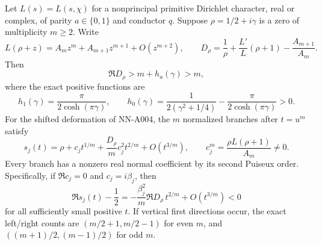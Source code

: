 \begin{theorem}
\label{thm:analytic-multiple-dirichlet-bending}
Let $L(s)=L(s,\chi)$ for a nonprincipal primitive Dirichlet
character, real or complex, of parity $a\in\{0,1\}$ and
conductor $q$. Suppose $\rho=1/2+i\gamma$ is a zero of
multiplicity $m\ge2$. Write
\[
 L(\rho+z)=A_mz^m+A_{m+1}z^{m+1}+O(z^{m+2}),
 \qquad
 D_\rho=\frac1\rho+\frac{L'}L(\rho+1)
                              -\frac{A_{m+1}}{A_m}.
\]
Then
\begin{equation}\label{eq:analytic-multiple-D-positive}
 \Re D_\rho>m+h_a(\gamma)>m,
\end{equation}
where the exact positive functions are
\[
 h_1(\gamma)=\frac{\pi}{2\cosh(\pi\gamma)},\qquad
 h_0(\gamma)=\frac1{2(\gamma^2+1/4)}
                      -\frac{\pi}{2\cosh(\pi\gamma)}>0.
\]
For the shifted deformation of NN-A004, the $m$ normalized
branches after $t=u^m$ satisfy
\begin{equation}\label{eq:analytic-multiple-full-jets}
 s_j(t)=\rho+c_jt^{1/m}
                  +\frac{D_\rho}{m}c_j^2t^{2/m}
                  +O(t^{3/m}),\qquad
 c_j^m=\frac{\rho L(\rho+1)}{A_m}\ne0.
\end{equation}
Every branch has a nonzero real normal coefficient by its
second Puiseux order. Specifically, if $\Re c_j=0$ and
$c_j=i\beta_j$, then
\[
 \Re s_j(t)-\frac12
       =-\frac{\beta_j^2}{m}\Re D_\rho\,t^{2/m}
                         +O(t^{3/m})<0
\]
for all sufficiently small positive $t$.
If vertical first directions occur, the exact left/right
counts are $(m/2+1,m/2-1)$ for even $m$, and
$((m+1)/2,(m-1)/2)$ for odd $m$.
\end{theorem}

